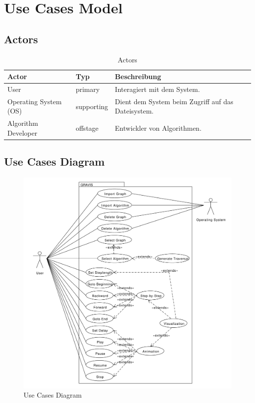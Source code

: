 \section{Use Cases Model}
\label{sec:Use Cases Model}
% 
\subsection{Actors}
\label{subsec:Actors}
\begin{table}[htp]
  \begin{tabular}[t]{|l|l|l|}\hline
	  \rowcolor{tcA}
	  Actor 			& Typ 		& Beschreibung \\\hline
	  User		 		& primary 	& Interagiert mit dem System. \\\hline
	  Operating System (OS) 	& supporting 	& Dient dem System beim Zugriff auf das Dateisystem. \\\hline
	  Algorithm Developer 		& offstage 	& Entwickler von Algorithmen. \\\hline
  \end{tabular}
  \caption{Actors}
  \label{tab:actors}
\end{table}

% 
\subsection{Use Cases Diagram}
\label{subsec:Use Cases Diagram}
\begin{figure}[H]
    \centering
    \includegraphics[scale=0.5]{diagrams/use-cases-diagram.pdf}
    \caption{Use Cases Diagram}
    \label{fig:use_cases_diagram}
\end{figure}
% 
